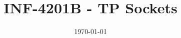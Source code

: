 \documentclass[a4paper, frenchb, 11pt]{article}
\title{
	\textbf{INF-4201B - TP Sockets}\\
}
\date{\today}
\begin{document}
\maketitle
\newpage

\tableofcontents
\newpage


\newpage


\newpage


\newpage


\newpage


\newpage


\newpage

\renewcommand\refname{Ressources utilisées}
\begin{thebibliography}{5} %
\end{thebibliography}
\end{document}
